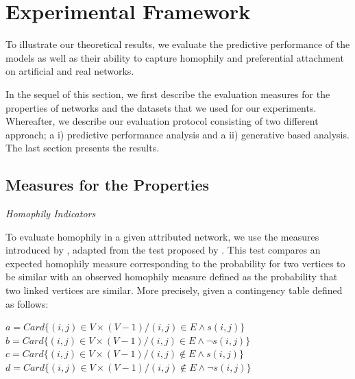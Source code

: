 \section{Experimental Framework}
\label{sec:experiments}


To illustrate our theoretical results, we evaluate the predictive performance of the models as well as their ability to capture homophily and preferential attachment on artificial and real networks.  

In the sequel of this section, we first describe the evaluation measures for the  properties of networks and the datasets that we used for our experiments. Whereafter, we describe our evaluation protocol consisting of two different approach; a i) predictive performance analysis and a ii) generative based analysis. The last section presents the results.



\subsection{Measures for the Properties}

\textit{Homophily Indicators}

To evaluate homophily in a given attributed network, we use the measures introduced by \cite{largeron2015}, adapted from the test proposed by \cite{Easley2010}.  This test compares an expected homophily measure corresponding to the probability for two vertices to be similar with an observed homophily measure defined as the probability that two linked vertices are similar. More precisely, given a contingency table defined as follows:

$a = Card\{(i,j)\in V\times (V-1) / (i,j) \in E \land s(i,j)\}$\\
$b = Card\{(i,j)\in V\times (V-1) / (i,j) \in E \land \neg{s(i,j)}\}$\\ 
$c = Card\{(i,j)\in V\times (V-1) / (i,j) \notin E \land s(i,j)\}$\\
$d = Card\{(i,j)\in V\times (V-1) / (i,j) \notin E \land \neg{s(i,j)}\}$\\

